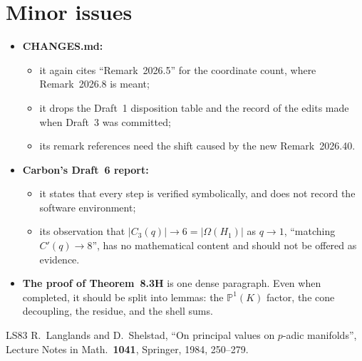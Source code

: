 \documentclass[12pt,letterpaper]{article}
\begin{document}
\section*{Minor issues}

\begin{itemize}[leftmargin=1.5em]
\item \textbf{CHANGES.md:}
\begin{itemize}[leftmargin=1.5em]
\item it again cites ``Remark~2026.5'' for the coordinate count, where
Remark~2026.8 is meant;
\item it drops the Draft~1 disposition table and the record of the edits made
when Draft~3 was committed;
\item its remark references need the shift caused by the new
Remark~2026.40.
\end{itemize}
\item \textbf{Carbon's Draft~6 report:}
\begin{itemize}[leftmargin=1.5em]
\item it states that every step is verified symbolically, and does not record
the software environment;
\item its observation that $|C_3(q)|\to6=|\Omega(H_1)|$ as $q\to1$, ``matching
$C'(q)\to8$'', has no mathematical content and should not be offered as
evidence.
\end{itemize}
\item \textbf{The proof of Theorem~8.3H} is one dense paragraph. Even when
completed, it should be split into lemmas: the $\mathbb P^1(K)$ factor, the
cone decoupling, the residue, and the shell sums.
\end{itemize}

\begin{thebibliography}{LS83}
 R.~Langlands and D.~Shelstad, ``On principal values on
$p$-adic manifolds'', Lecture Notes in Math.\ \textbf{1041}, Springer, 1984,
250--279.
\end{thebibliography}
\end{document}
